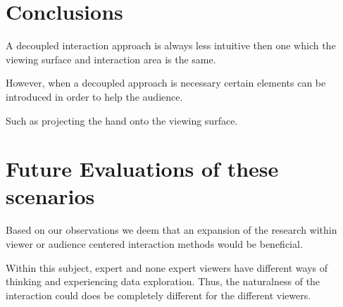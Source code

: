 \documentclass[review,journal]{vgtc}         %
\begin{document}
\section{Conclusions}\label{sec:conclusion}

A decoupled interaction approach is always less intuitive then one which the viewing surface and interaction area is the same.

However, when a decoupled approach is necessary certain elements can be introduced in order to help the audience.

Such as projecting the hand onto the viewing surface.

\section{Future Evaluations of these scenarios}\label{sec:future}

Based on our observations we deem that an expansion of the research within viewer or audience centered interaction methods would be beneficial.

Within this subject, expert and none expert viewers have different ways of thinking and experiencing data exploration. Thus, the naturalness of the interaction could does be completely different for the different viewers.



\end{document}
